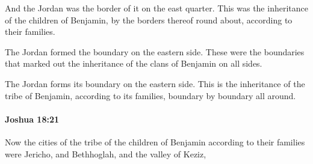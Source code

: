 			\begin{versebox}
					\item[BHS] 
					\item[ASV] And the Jordan was the border of it on the east quarter. This was the inheritance of the children of Benjamin, by the borders thereof round about, according to their families.
					\item[NIV] The Jordan formed the boundary on the eastern side. These were the boundaries that marked out the inheritance of the clans of Benjamin on all sides.
					\item[NRSV] The Jordan forms its boundary on the eastern side. This is the inheritance of the tribe of Benjamin, according to its families, boundary by boundary all around.
			\end{versebox}

		\paragraph{Joshua 18:21} %
			\label{JOSHUA-18-21}

			Now the cities of the tribe of the children of Benjamin according to their families were Jericho, and Bethhoglah, and the valley of Keziz,

